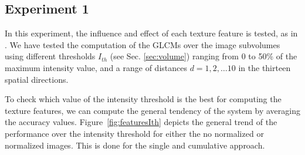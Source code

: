 \subsection{Experiment 1}
In this experiment, the influence and effect of each texture feature is tested, as in \cite{Martinez-Murcia2013266}. We have tested the computation of the \acp{GLCM} over the image subvolumes using different thresholds $I_{th}$ (see Sec. \ref{sec:volume}) ranging from 0 to 50\% of the maximum intensity value, and a range of distances $d=1,2,\dots10$ in the thirteen spatial directions.

To check which value of the intensity threshold is the best for computing the texture features, we can compute the general tendency of the system by averaging the accuracy values. Figure~\ref{fig:featuresIth} depicts the general trend of the performance over the intensity threshold for either the no normalized or normalized images. This is done for the single and cumulative approach. 

